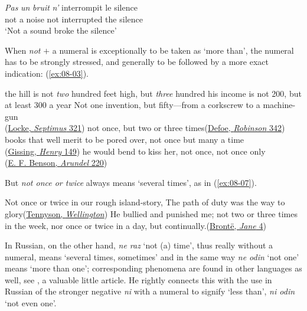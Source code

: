 \ea \label{ex:08-02}
\gll \emph{Pas} \emph{un} \emph{bruit} \emph{n'} interrompit le silence\\
 not a noise not interrupted the silence\\
\glt `Not a sound broke the silence'
\z

When \textit{not} \(+\) a numeral is exceptionally to be taken as `more than', the numeral has to be strongly stressed, and generally to be followed by a more exact indication: (\ref{ex:08-03}).

\ea \label{ex:08-03}
\ea the hill is not \emph{two} hundred feet high, but \emph{three} hundred
\ex his income is not 200, but at least 300 a year
\ex
Not one invention, but fifty---from a corkscrew to a machine-gun\\\hfill(\href{https://archive.org/details/septimus00unkngoog/page/n297/mode/2up?q=%22not+one+invention%22&view=theater}{Locke, \textit{Septimus} 321})
\ex
not once, but two or three times\hfill(\href{https://archive.org/details/lifeandstranges00dobsgoog/page/n367/mode/2up?q=%22not+once%2C+but%22&view=theater}{Defoe, \textit{Robinson} 342})
\ex
books that well merit to be pored over, not once but many a time\\\hfill(\href{https://archive.org/details/privatepapersofh0000geor/page/158/mode/2up?q=%22Books+that+well+merit%22&view=theater}{Gissing, \textit{Henry} 149})
\ex
he would bend to kiss her, not once, not once only\\\hfill(\href{https://archive.org/details/arundel00bens/page/202/mode/2up?q=%22would+bend+to+kiss+her%22&view=theater}{E. F. Benson, \textit{Arundel} 220})
\z
\z

But \textit{not once or twice} always means `several times', as in (\ref{ex:08-07}).

\ea \label{ex:08-07}
\ea
Not once or twice in our rough island-story, The path of duty was the way to glory\hfill(\href{https://en.wikisource.org/wiki/Maud,_and_other_poems/Ode_on_the_Death_of_the_Duke_of_Wellington}{Tennyson, \textit{Wellington}})
\ex
He bullied and punished me; not two or three times in the week, nor once or twice in a day, but continually.\hfill(\href{https://archive.org/details/JaneEyre-CharlotteBronte/page/n11/mode/2up?q=%22punished+me%22&view=theater}{Brontë, \textit{Jane} 4}) %
\z
\z
{}

In Russian, on the other hand, \textit{ne raz} `not (a) time', thus really without a numeral, means `several times, sometimes' and in the same way \textit{ne odin} `not one' means `more than one'; corresponding phenomena are found in other languages as well, see \citet{schuchardt1894anaugust}, a valuable little article.
He rightly connects this with the use in Russian of the stronger negative \textit{ni} with a numeral to signify `less than', \textit{ni odin} `not even one'.

